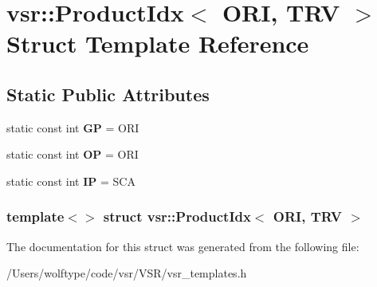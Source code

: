 \hypertarget{structvsr_1_1_product_idx_3_01_o_r_i_00_01_t_r_v_01_4}{\section{vsr\-:\-:Product\-Idx$<$ O\-R\-I, T\-R\-V $>$ Struct Template Reference}
\label{structvsr_1_1_product_idx_3_01_o_r_i_00_01_t_r_v_01_4}
}
\subsection*{Static Public Attributes}
\begin{DoxyCompactItemize}
\item 
\hypertarget{structvsr_1_1_product_idx_3_01_o_r_i_00_01_t_r_v_01_4_afbf125e7425a2c1bf7064eb4aa5ab591}{static const int {\bfseries G\-P} = O\-R\-I}\label{structvsr_1_1_product_idx_3_01_o_r_i_00_01_t_r_v_01_4_afbf125e7425a2c1bf7064eb4aa5ab591}

\item 
\hypertarget{structvsr_1_1_product_idx_3_01_o_r_i_00_01_t_r_v_01_4_a96d72635e94278647094545246a53edb}{static const int {\bfseries O\-P} = O\-R\-I}\label{structvsr_1_1_product_idx_3_01_o_r_i_00_01_t_r_v_01_4_a96d72635e94278647094545246a53edb}

\item 
\hypertarget{structvsr_1_1_product_idx_3_01_o_r_i_00_01_t_r_v_01_4_ac694b1bb2039e6528ef5da6a15907bff}{static const int {\bfseries I\-P} = S\-C\-A}\label{structvsr_1_1_product_idx_3_01_o_r_i_00_01_t_r_v_01_4_ac694b1bb2039e6528ef5da6a15907bff}

\end{DoxyCompactItemize}
\subsubsection*{template$<$$>$ struct vsr\-::\-Product\-Idx$<$ O\-R\-I, T\-R\-V $>$}



The documentation for this struct was generated from the following file\-:\begin{DoxyCompactItemize}
\item 
/\-Users/wolftype/code/vsr/\-V\-S\-R/vsr\-\_\-templates.\-h\end{DoxyCompactItemize}
